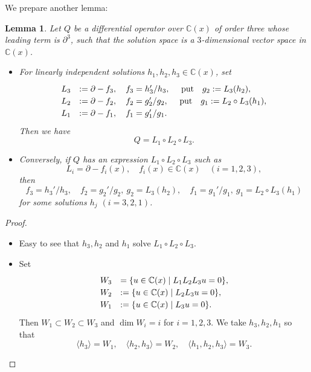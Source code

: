\documentclass[a4paper,12pt]{article}
\newtheorem{lemma}[thm]{Lemma}
\theoremstyle{definition}
\theoremstyle{remark}
\numberwithin{equation}{section} %
\begin{document}
We prepare another lemma:
\begin{lemma}\label{LLL}
Let $Q$ be a differential operator over $\mathbb{C}(x)$ of order three 
whose leading term is $\partial^3$,
such that the solution space is a $3$-dimensional vector space in $\mathbb{C}(x)$.
\begin{itemize}
\item[{\rm(1)}]
For linearly independent solutions  $h_1, h_2, h_3 \in \mathbb{C}(x)$, set
\[ \def\arraystretch{1.2}
\begin{array}{ll}
L_3&:=\partial-f_3, \quad f_3={h_3'}/{h_3},\ \quad{\rm put}\quad g_2 := L_3(h_2),\\
L_2 &:= \partial - f_2,\quad f_2={g'_2}/{g_2},\ \quad{\rm put}\quad g_1 := L_2\circ L_3(h_1), \\
L_1 &:= \partial - f_1,\quad f_1={g'_1}/{g_1}.\end{array}
\]
Then we have
\[
Q = L_1\circ L_2\circ L_3.
\]
\item[{\rm(2)}]
Conversely, if $Q$ has an expression $L_1\circ L_2\circ L_3$ such as
$$L_i=\partial - f_i(x),\quad f_i(x)\in\mathbb{C}(x) \quad(i=1,2,3),$$
then 
$$f_3=h_3'/h_3,\quad f_2=g_2'/g_2,\ g_2=L_3(h_2),\quad f_1=g_1'/g_1,\ g_1=L_2\circ L_3(h_1)$$ for some solutions $h_j$ $(i=3,2,1)$.
\end{itemize}

\end{lemma}
\begin{proof}\begin{itemize}
\item[{\rm(1)}] Easy to see that $h_3,h_2$ and $h_1$ solve $L_1\circ L_2\circ L_3$.
\item[{\rm(2)}]  Set
  \[ \def\arraystretch{1.2}
  \begin{array}{ll}W_3 &= \{ u \in \mathbb{C}(x) \mid L_1L_2L_3u=0 \},\\
  W_2 &:= \{ u \in\mathbb{C}(x) \mid L_2 L_3 u = 0 \},\\
  W_1 &:= \{ u \in \mathbb{C}(x) \mid L_3 u = 0\}.
  \end{array}\]
Then $W_1 \subset W_2 \subset W_3$ and $\dim W_i = i$ for $i=1,2,3$.
We take $h_3, h_2, h_1 $ so that
\[
\langle h_3 \rangle = W_1,
\quad
\langle h_2,h_3 \rangle = W_2,
\quad
\langle h_1, h_2,h_3 \rangle = W_3.
\]
\end{itemize}
\end{proof}
\end{document}
